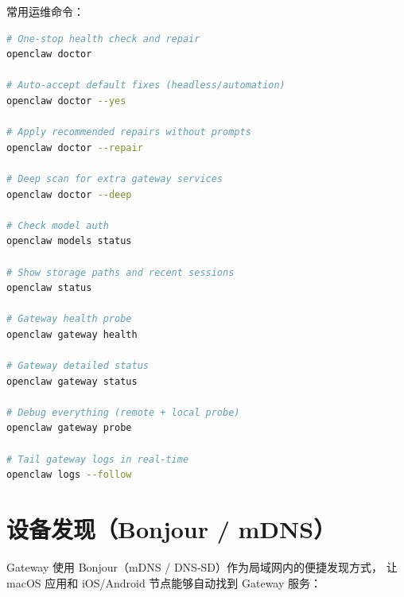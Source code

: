 \noindent 常用运维命令：

\begin{lstlisting}[language=bash]
# One-stop health check and repair
openclaw doctor

# Auto-accept default fixes (headless/automation)
openclaw doctor --yes

# Apply recommended repairs without prompts
openclaw doctor --repair

# Deep scan for extra gateway services
openclaw doctor --deep

# Check model auth
openclaw models status

# Show storage paths and recent sessions
openclaw status

# Gateway health probe
openclaw gateway health

# Gateway detailed status
openclaw gateway status

# Debug everything (remote + local probe)
openclaw gateway probe

# Tail gateway logs in real-time
openclaw logs --follow
\end{lstlisting}

\section{设备发现（Bonjour / mDNS）}

Gateway 使用 Bonjour（mDNS / DNS-SD）作为局域网内的便捷发现方式，
让 macOS 应用和 iOS/Android 节点能够自动找到 Gateway 服务：

\begin{center}
\end{center}

